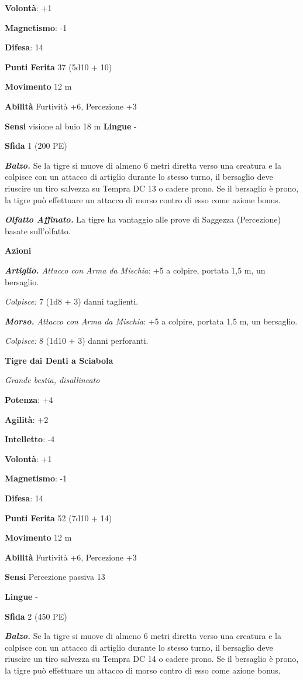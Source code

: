 \begin{multicols}{2}
\textbf{Volontà}: +1

\textbf{Magnetismo}: -1

\textbf{Difesa}: 14

\textbf{Punti Ferita} 37 (5d10 + 10)

\textbf{Movimento} 12 m

\textbf{Abilità} Furtività +6, Percezione +3

\textbf{Sensi} visione al buio 18 m
\textbf{Lingue} -

\textbf{Sfida} 1 (200 PE)

\emph{\textbf{Balzo.}} Se la tigre si muove di almeno 6 metri diretta
verso una creatura e la colpisce con un attacco di artiglio durante lo
stesso turno, il bersaglio deve riuscire un tiro salvezza su Tempra DC 13
o cadere prono. Se il bersaglio è prono, la tigre può effettuare un
attacco di morso contro di esso come azione bonus.

\emph{\textbf{Olfatto Affinato.}} La tigre ha vantaggio alle prove di
Saggezza (Percezione) basate sull'olfatto.

\textbf{Azioni}

\emph{\textbf{Artiglio.} Attacco con Arma da Mischia}: +5 a colpire,
portata 1,5 m, un bersaglio.

\emph{Colpisce:} 7 (1d8 + 3) danni taglienti.

\emph{\textbf{Morso.} Attacco con Arma da Mischia}: +5 a colpire,
portata 1,5 m, un bersaglio.

\emph{Colpisce:} 8 (1d10 + 3) danni perforanti.

\textbf{Tigre dai Denti a Sciabola}

\emph{Grande bestia, disallineato}

\textbf{Potenza}: +4

\textbf{Agilità}: +2

\textbf{Intelletto}: -4

\textbf{Volontà}: +1

\textbf{Magnetismo}: -1

\textbf{Difesa}: 14

\textbf{Punti Ferita} 52 (7d10 + 14)

\textbf{Movimento} 12 m

\textbf{Abilità} Furtività +6, Percezione +3

\textbf{Sensi} Percezione passiva 13

\textbf{Lingue} -

\textbf{Sfida} 2 (450 PE)

\emph{\textbf{Balzo.}} Se la tigre si muove di almeno 6 metri diretta
verso una creatura e la colpisce con un attacco di artiglio durante lo
stesso turno, il bersaglio deve riuscire un tiro salvezza su Tempra DC 14
o cadere prono. Se il bersaglio è prono, la tigre può effettuare un
attacco di morso contro di esso come azione bonus.


\end{multicols}

